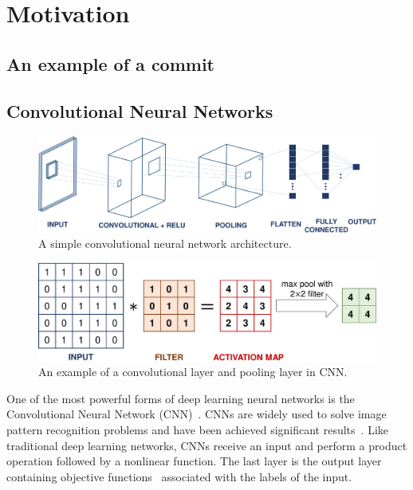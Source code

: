 
\section{Motivation}
\label{sec:motivation}



\subsection{An example of a commit }
\label{sec:examle}

\subsection{Convolutional Neural Networks}
\label{sec:background_cnn}

\begin{figure}[t!]
	\center
	\includegraphics[scale=0.3]{figs/cnn.pdf}
	\caption{A simple convolutional neural network architecture.}
	\label{fig:cnn}
\end{figure}

\begin{figure}[t!]
	\center
	\includegraphics[scale=0.3]{figs/filter_pooling.pdf}
	\caption{An example of a convolutional layer and pooling layer in CNN.}
	\label{fig:filter}
\end{figure}

One of the most powerful forms of deep learning neural networks is the Convolutional Neural Network (CNN)~\cite{lecun2015deep}. CNNs are widely used to solve image pattern recognition problems and have been achieved significant results~\cite{karpathy2014large, lawrence1997face, krizhevsky2012imagenet}. Like traditional deep learning networks, CNNs receive an input and perform a product operation followed by a nonlinear function. The last layer is the output layer containing objective functions~\cite{zhao2017loss} associated with the labels of the input.

